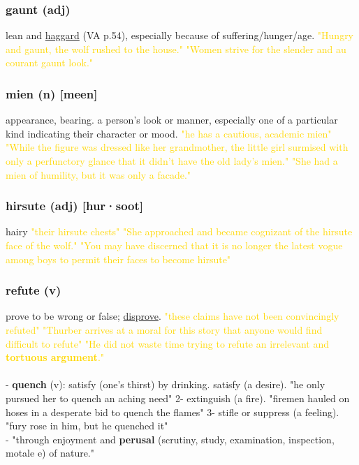 \documentclass{proc}
\begin{document}
	\subsubsection{\textcolor{brickred}{gaunt} (adj)}
	lean and \underline{haggard} (VA p.54), especially because of suffering/hunger/age.
	\textcolor{gold}{"Hungry and gaunt, the wolf rushed to the house." "Women strive for the slender and au courant gaunt look."}
	
	\subsubsection{\textcolor{brickred}{mien} (n) [meen]}
	appearance, bearing. a person's look or manner, especially one of a particular kind indicating their character or mood.
	\textcolor{gold}{"he has a cautious, academic mien" "While the figure was 
		dressed like her grandmother, the little girl surmised with 
		only a perfunctory glance that it didn't have the old lady's 
		mien." "She had a mien of humility, but it was only a facade."}
	
	\subsubsection{\textcolor{brickred}{hirsute} (adj) [hur·soot]}
	hairy
	\textcolor{gold}{"their hirsute chests" "She approached and became cognizant of the hirsute 
		face of the wolf." "You may have discerned that it is no longer the latest vogue among boys to permit
		their faces to become hirsute"}
	
	\subsubsection{\textcolor{brickred}{refute} (v)}
	prove to be wrong or false; \underline{disprove}.
	\textcolor{gold}{"these claims have not been convincingly refuted" "Thurber arrives at a moral for this story 
		that anyone would find difficult to refute" "He did not waste time trying to refute an irrelevant and \textbf{tortuous 
		argument}."}\\\\
	- \textbf{quench} (v): satisfy (one's thirst) by drinking. satisfy (a desire). "he only pursued her to quench an aching need" 2- extinguish (a fire). "firemen hauled on hoses in a desperate bid to quench the flames" 3- stifle or suppress (a feeling). "fury rose in him, but he quenched it"\\
- "through enjoyment and \textbf{perusal} (scrutiny, study, examination, inspection, motale e) of nature."
	
\end{document}
